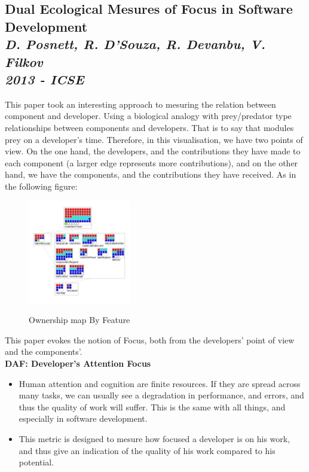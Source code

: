 \subsection{Dual Ecological Mesures of Focus in Software Development\\ \textit{D. Posnett, R. D’Souza, R. Devanbu, V. Filkov\\ 2013 - ICSE}}

This paper took an interesting approach to mesuring the relation between component and developer. Using a biological analogy with prey/predator type relationships between components and developers. That is to say that modules prey on a developer's time. Therefore, in this visualisation, we have two points of view. On the one hand, the developers, and the contributions they have made to each component (a larger edge represents more contributions), and on the other hand, we have the components, and the contributions they have received. As in the following figure:

\begin{figure}[H]
\centering
\includegraphics[width=0.4\textwidth]{./resources/girba2007.png}~
\caption{Ownership map By Feature}
\label{fig:ownership_map_by_feature}
\end{figure}

This paper evokes the notion of Focus, both from the developers' point of view and the components'.
\\[0.4cm]
\textbf{DAF: Developer’s Attention Focus}
\begin{itemize}
\item Human attention and cognition are finite resources. If they are spread across many tasks, we can usually see a degradation in performance, and errors, and thus the quality of work will suffer. This is the same with all things, and especially in software development.
\item This metric is designed to mesure how focused a developer is on his work, and thus give an indication of the quality of his work compared to his potential.
\end{itemize}

